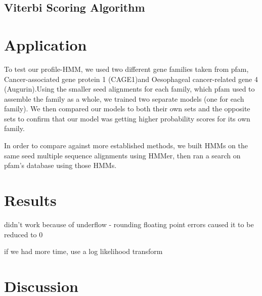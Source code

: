 \documentclass{article}
\begin{document}
\subsection{Viterbi Scoring Algorithm}


\section{Application}
To test our profile-HMM, we used two different gene families taken from pfam, Cancer-associated gene protein 1 (CAGE1)\footnotemark[3] and Oesophageal cancer-related gene 4 (Augurin).\footnotemark[4] Using the smaller seed alignments for each family, which pfam used to assemble the family as a whole, we trained two separate models (one for each family). We then compared our models to both their own sets and the opposite sets to confirm that our model was getting higher probability scores for its own family.

In order to compare against more established methods, we built HMMs on the same seed multiple sequence alignments using HMMer, then ran a search on pfam's database using those HMMs. 


\section{Results}
didn't work because of underflow - rounding floating point errors caused it to be reduced to 0

if we had more time, use a log likelihood transform 

\section{Discussion}


% 
% 
% 



% 
\end{document}
